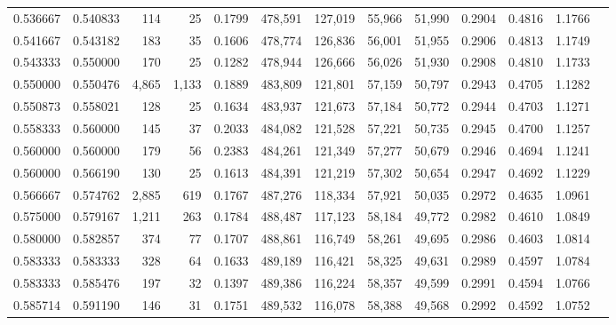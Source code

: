 \begin{tabular}{rrrrrrrrrrrrr}
0.536667 & 0.540833 &    114 &     25 &                                     0.1799 & 478,591 & 127,019 &  55,966 &  51,990 & 0.2904 & 0.4816 & 1.1766 \\
0.541667 & 0.543182 &    183 &     35 &                                     0.1606 & 478,774 & 126,836 &  56,001 &  51,955 & 0.2906 & 0.4813 & 1.1749 \\
0.543333 & 0.550000 &    170 &     25 &                                     0.1282 & 478,944 & 126,666 &  56,026 &  51,930 & 0.2908 & 0.4810 & 1.1733 \\
0.550000 & 0.550476 &  4,865 &  1,133 &                                     0.1889 & 483,809 & 121,801 &  57,159 &  50,797 & 0.2943 & 0.4705 & 1.1282 \\
0.550873 & 0.558021 &    128 &     25 &                                     0.1634 & 483,937 & 121,673 &  57,184 &  50,772 & 0.2944 & 0.4703 & 1.1271 \\
0.558333 & 0.560000 &    145 &     37 &                                     0.2033 & 484,082 & 121,528 &  57,221 &  50,735 & 0.2945 & 0.4700 & 1.1257 \\
0.560000 & 0.560000 &    179 &     56 &                                     0.2383 & 484,261 & 121,349 &  57,277 &  50,679 & 0.2946 & 0.4694 & 1.1241 \\
0.560000 & 0.566190 &    130 &     25 &                                     0.1613 & 484,391 & 121,219 &  57,302 &  50,654 & 0.2947 & 0.4692 & 1.1229 \\
0.566667 & 0.574762 &  2,885 &    619 &                                     0.1767 & 487,276 & 118,334 &  57,921 &  50,035 & 0.2972 & 0.4635 & 1.0961 \\
0.575000 & 0.579167 &  1,211 &    263 &                                     0.1784 & 488,487 & 117,123 &  58,184 &  49,772 & 0.2982 & 0.4610 & 1.0849 \\
0.580000 & 0.582857 &    374 &     77 &                                     0.1707 & 488,861 & 116,749 &  58,261 &  49,695 & 0.2986 & 0.4603 & 1.0814 \\
0.583333 & 0.583333 &    328 &     64 &                                     0.1633 & 489,189 & 116,421 &  58,325 &  49,631 & 0.2989 & 0.4597 & 1.0784 \\
0.583333 & 0.585476 &    197 &     32 &                                     0.1397 & 489,386 & 116,224 &  58,357 &  49,599 & 0.2991 & 0.4594 & 1.0766 \\
0.585714 & 0.591190 &    146 &     31 &                                     0.1751 & 489,532 & 116,078 &  58,388 &  49,568 & 0.2992 & 0.4592 & 1.0752 \\

\end{tabular}
